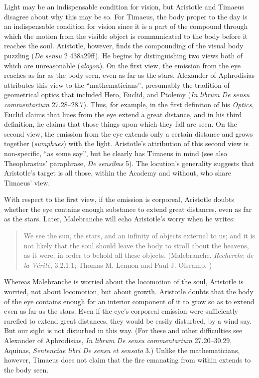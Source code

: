 Light may be an indispensable condition for vision, but Aristotle and Timaeus disagree about why this may be so. For Timaeus, the body proper to the day is an indispensable condition for vision since it is a part of the compound through which the motion from the visible object is communicated to the body before it reaches the soul. Aristotle, however, finds the compounding of the visual body puzzling (\emph{De sensu} 2 438a29ff). He begins by distinguishing two views both of which are unreasonable (\emph{alogon}). On the first view, the emission from the eye reaches as far as the body seen, even as far as the stars. Alexander of Aphrodisias attributes this view to the ``mathematicians'', presumably the tradition of geometrical optics that included Hero, Euclid, and Ptolemy (\emph{In librum De sensu commentarium} 27.28--28.7). Thus, for example, in the first definiton of his \emph{Optics}, Euclid claims that lines from the eye extend a great distance, and in his third definition, he claims that those things upon which they fall are seen. On the second view, the emission from the eye extends only a certain distance and grows together (\emph{sumphues}) with the light. Aristotle's attribution of this second view is non-specific, ``as some say'', but he clearly has Timaeus in mind (see also Theophrastus' paraphrase, \emph{De sensibus} 5). The locution's generality suggests that Aristotle's target is all those, within the Academy and without, who share Timaeus' view.

With respect to the first view, if the emission is corporeal, Aristotle doubts whether the eye contains enough substance to extend great distances, even as far as the stars. Later, Malebranche will echo Aristotle's worry when he writes:
\begin{quote}
	We see the sun, the stars, and an infinity of objects external to us; and it is not likely that the soul should leave the body to stroll about the heavens, as it were, in order to behold all these objects. (Malebranche, \emph{Recherche de la V\'{e}rit\'{e}}, 3.2.1.1; Thomas M. Lennon and Paul J. Olscamp, \citeyear[217]{Malebranche:1997sf})
\end{quote}
Whereas Malebranche is worried about the locomotion of the soul, Aristotle is worried, not about locomotion, but about growth. Aristotle doubts that the body of the eye contains enough for an interior component of it to grow so as to extend even as far as the stars. Even if the eye's corporeal emission were sufficiently rarefied to extend great distances, they would be easily disturbed, by a wind say. But our sight is not disturbed in this way.  (For these and other difficulties see Alexander of Aphrodisias, \emph{In librum De sensu commentarium} 27.20--30.29, Aquinas, \emph{Sentenciae libri De sensu et sensato} 3.) Unlike the mathematicians, however, Timaeus does not claim that the fire emanating from within extends to the body seen.

